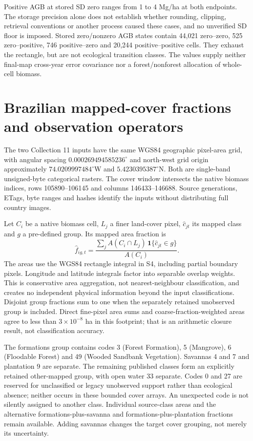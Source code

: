 \documentclass[11pt,a4paper]{article}
\begin{document}
Positive AGB at stored SD zero ranges from 1 to 4 Mg/ha at both endpoints. The storage precision alone does not establish whether rounding, clipping, retrieval conventions or another process caused these cases, and no unverified SD floor is imposed. Stored zero/nonzero AGB states contain 44,021 zero--zero, 525 zero--positive, 746 positive--zero and 20,244 positive--positive cells. They exhaust the rectangle, but are not ecological transition classes. The values supply neither final-map cross-year error covariance nor a forest/nonforest allocation of whole-cell biomass.

\section{Brazilian mapped-cover fractions and observation operators}

The two Collection 11 inputs have the same WGS84 geographic pixel-area grid, with angular spacing $0.000269494585236^\circ$ and north-west grid origin approximately $74.0209997484^\circ$W and $5.4230395387^\circ$N. Both are single-band unsigned-byte categorical rasters. The cover window intersects the native biomass indices, rows 105890--106145 and columns 146433--146688. Source generations, ETags, byte ranges and hashes identify the inputs without distributing full country images.

Let $C_i$ be a native biomass cell, $L_j$ a finer land-cover pixel, $\widehat c_{jt}$ its mapped class and $g$ a pre-defined group. Its mapped area fraction is
\begin{equation}
\widehat f_{ig,t}=\frac{\sum_j A(C_i\cap L_j)\,\mathbf1\{\widehat c_{jt}\in g\}}{A(C_i)}.
\end{equation}
The areas use the WGS84 rectangle integral in S4, including partial boundary pixels. Longitude and latitude integrals factor into separable overlap weights. This is conservative area aggregation, not nearest-neighbour classification, and creates no independent physical information beyond the input classifications. Disjoint group fractions sum to one when the separately retained unobserved group is included. Direct fine-pixel area sums and coarse-fraction-weighted areas agree to less than $3\times10^{-8}$ ha in this footprint; that is an arithmetic closure result, not classification accuracy.

The formations group contains codes 3 (Forest Formation), 5 (Mangrove), 6 (Floodable Forest) and 49 (Wooded Sandbank Vegetation). Savannas 4 and 7 and plantation 9 are separate. The remaining published classes form an explicitly retained other-mapped group, with open water 33 separate. Codes 0 and 27 are reserved for unclassified or legacy unobserved support rather than ecological absence; neither occurs in these bounded cover arrays. An unexpected code is not silently assigned to another class. Individual source-class areas and the alternative formations-plus-savanna and formations-plus-plantation fractions remain available. Adding savannas changes the target cover grouping, not merely its uncertainty.
\end{document}
